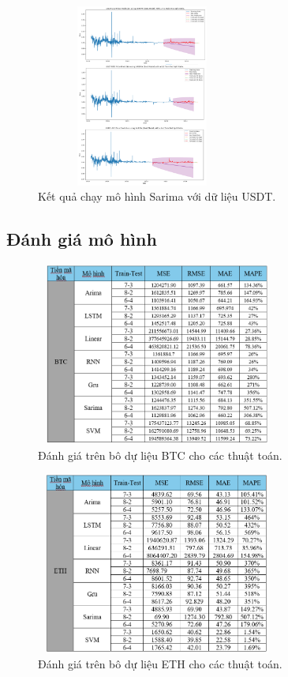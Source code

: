 \documentclass[conference]{IEEEtran}
\begin{document}
\begin{figure}[H] %
    \centering
    \includegraphics[width=7cm, height=6cm]{Images/Sarima-USDT.png} %
    \caption{Kết quả chạy mô hình Sarima với dữ liệu USDT.}
    \label{fig:arima-model}
\end{figure}

\subsection{Đánh giá mô hình}

\begin{figure}[H] %
    \centering
    \includegraphics[width=8cm, height=6cm]{Images/Chỉ số đo BTC.png} %
    \caption{Đánh giá trên bô dự liệu BTC cho các thuật toán.}
    \label{fig:arima-model}
\end{figure}

\begin{figure}[H] %
    \centering
    \includegraphics[width=8cm, height=6cm]{Images/Chỉ số đo ETH.png} %
    \caption{Đánh giá trên bô dự liệu ETH cho các thuật toán.}
    \label{fig:arima-model}
\end{figure}
\end{document}
